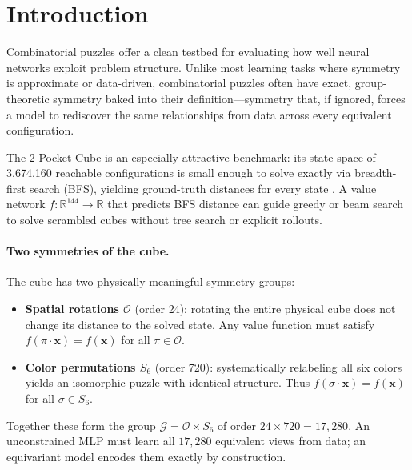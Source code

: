 \documentclass[11pt]{article}
\newcommand{\bx}{\mathbf{x}}
\newcommand{\R}{\mathbb{R}}
\begin{document}
\section{Introduction}
\label{sec:intro}

Combinatorial puzzles offer a clean testbed for evaluating how well neural
networks exploit problem structure.
Unlike most learning tasks where symmetry is approximate or data-driven,
combinatorial puzzles often have exact, group-theoretic symmetry baked
into their definition—symmetry that, if ignored, forces a model to rediscover
the same relationships from data across every equivalent configuration.

The 2 Pocket Cube is an
especially attractive benchmark: its state space of 3,674,160 reachable
configurations is small enough to solve exactly via breadth-first search
(BFS), yielding ground-truth distances for every state
\cite{agostinelli2019solving}.
A value network $f: \R^{144} \to \R$ that predicts BFS distance can guide
greedy or beam search to solve scrambled cubes without tree search or
explicit rollouts.

\paragraph{Two symmetries of the cube.}
The cube has two physically meaningful symmetry groups:
\begin{itemize}
  \item \textbf{Spatial rotations $\mathcal{O}$} (order 24): rotating the
    entire physical cube does not change its distance to the solved state.
    Any value function must satisfy $f(\pi \cdot \bx) = f(\bx)$ for all
    $\pi \in \mathcal{O}$.
  \item \textbf{Color permutations $S_6$} (order 720): systematically
    relabeling all six colors yields an isomorphic puzzle with identical
    structure.
    Thus $f(\sigma \cdot \bx) = f(\bx)$ for all $\sigma \in S_6$.
\end{itemize}
Together these form the group $\mathcal{G} = \mathcal{O} \times S_6$ of
order $24 \times 720 = 17{,}280$.
An unconstrained MLP must learn all $17{,}280$ equivalent views from data;
an equivariant model encodes them exactly by construction.
\end{document}
